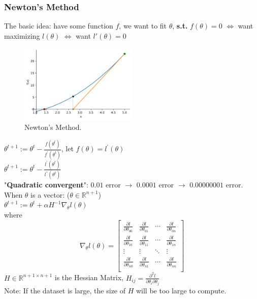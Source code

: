 \documentclass{article}
\begin{document}
\subsubsection{Newton's Method}
The basic idea: have some function $f$, we want to fit $\theta$, \textbf{s.t.} $f(\theta)=0$ $\iff$ want maximizing $l(\theta)$ $\iff$ want $l'(\theta)=0$\\
\begin{figure}[H]
	\centerline{
   \includegraphics[width=0.5\textwidth]{Fig2.png}}
   \caption{Newton's Method.}
   \label{fig:example}
\end{figure}
\noindent
$\theta^{t+1} := \theta^{t} - \frac{f(\theta^t)}{f^{'}(\theta^t)}$, let $f(\theta) = l^{'}(\theta)$\\
$\theta^{t+1} := \theta^{t} - \frac{l^{'}(\theta^t)}{l^{''}(\theta^t)}$\\

\noindent
"\textbf{Quadratic convergent}": $0.01$ error $\longrightarrow$ $0.0001$ error $\longrightarrow$ $0.00000001$ error.\\

\noindent
When $\theta$ is a vector: ($\theta \in \mathbb{R}^{n+1}$)\\
\indent
$\theta^{t+1} := \theta^t + \alpha H^{-1}\nabla_\theta l(\theta)$\\
where 
$$
\nabla_\theta l(\theta) = 
\begin{bmatrix}
  \frac{\partial l}{\partial\theta_{00}} & \frac{\partial l}{\partial\theta_{01}} & \cdots & \frac{\partial l}{\partial\theta_{0n}} \\
  \frac{\partial l}{\partial\theta_{10}} & \frac{\partial l}{\partial\theta_{11}} & \cdots & \frac{\partial l}{\partial\theta_{1n}} \\
  \vdots & \vdots  & \ddots & \vdots \\
  \frac{\partial l}{\partial\theta_{n0}} & \frac{\partial l}{\partial\theta_{n1}} & \cdots & \frac{\partial l}{\partial\theta_{nn}} \\
\end{bmatrix}
$$
$H \in \mathbb{R}^{n+1 \times n+1}$ is the Hessian Matrix, $H_{ij} = \frac{\partial^2l}{\partial\theta_i\partial\theta_j}$\\
Note: If the dataset is large, the size of $H$ will be too large to compute.
\end{document}
